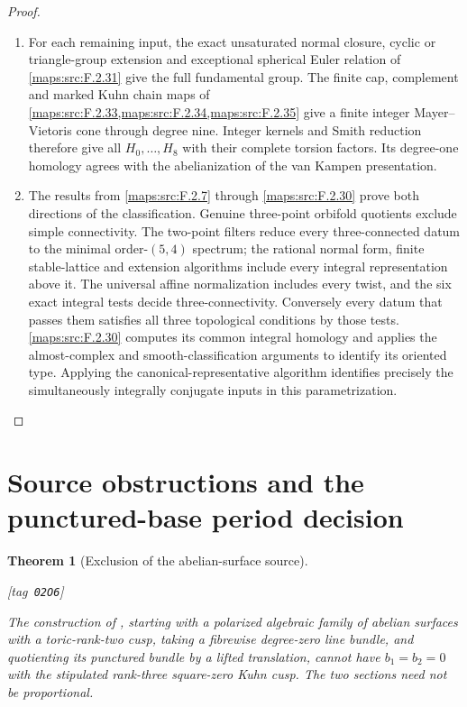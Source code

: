 \documentclass[11pt,a4paper]{article}
\numberwithin{equation}{section}
\newtheorem{theorem}{Theorem}[section]
\theoremstyle{definition}
\newcommand{\StatementRecord}[4]{{\upshape\footnotesize[tag~\texttt{#3}]}\enspace\ignorespaces}
\begin{document}
\begin{proof}
\begin{enumerate}[label=\arabic*.]
\item For each remaining input, the exact unsaturated normal
closure, cyclic or triangle-group extension and exceptional
spherical Euler relation of \ref{maps:src:F.2.31} give the full fundamental
group.  The finite cap, complement and marked Kuhn chain
maps of \cref{maps:src:F.2.33,maps:src:F.2.34,maps:src:F.2.35} give a finite integer Mayer--Vietoris cone
through degree nine.  Integer kernels and Smith reduction
therefore give all $H_0,\ldots,H_8$ with their complete
torsion factors. Its degree-one homology agrees with the
abelianization of the van Kampen presentation.

\item The results from \cref{maps:src:F.2.7} through \cref{maps:src:F.2.30} prove both directions of the classification.  Genuine three-point orbifold quotients
exclude simple connectivity.  The two-point filters reduce
every three-connected datum to the minimal order-$(5,4)$ spectrum; the
rational normal form, finite stable-lattice and extension
algorithms include every integral representation above it.
The universal affine normalization includes every twist,
and the six exact integral tests decide three-connectivity. Conversely every datum that passes them satisfies all three
topological conditions by those tests.  \ref{maps:src:F.2.30} computes
its common integral homology and applies the almost-complex
and smooth-classification arguments to identify its oriented
type. Applying the canonical-representative algorithm identifies
precisely the simultaneously integrally conjugate inputs in this
parametrization.

\end{enumerate}
\end{proof}




\section{Source obstructions and the punctured-base period decision}\label{pub:V:sec-oka}



\begin{theorem}[Exclusion of the abelian-surface source]\hypertarget{tag-02O6}{}\label{maps:src:F.3.4}
\StatementRecord{maps:src:F.3.4}{proved}{02O6}{\cref{maps:src:F.3.1}; \cite[Definition 4.2.4 and Proposition 4.2.5, p.~44; Theorem 4.2.6, p.~45]{ffDeligne}}


The construction of \cite{E26}, starting with a polarized
algebraic family of abelian surfaces with a toric-rank-two cusp,
taking a fibrewise degree-zero line bundle, and quotienting its
punctured bundle by a lifted translation, cannot have $b_1=b_2=0$
with the stipulated rank-three square-zero Kuhn cusp.
The two sections need not be proportional.

\end{theorem}
\end{document}
